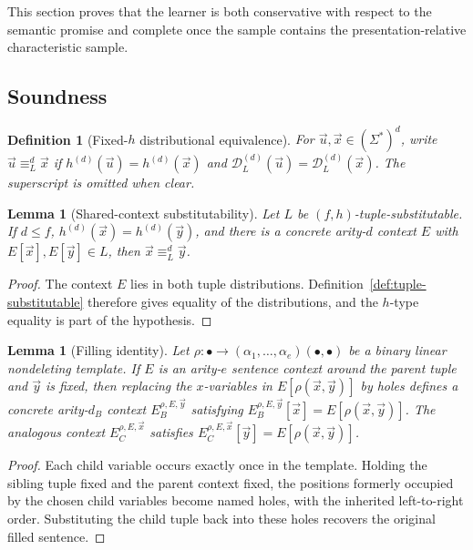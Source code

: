 \documentclass[11pt,a4paper]{article}
\newtheorem{lemma}[theorem]{Lemma}
\newtheorem{definition}[theorem]{Definition}
\theoremstyle{remark}
\newcommand{\D}{\mathcal{D}}
\newcommand{\tuple}[1]{\vec{#1}}
\begin{document}
This section proves that the learner is both conservative with respect to the
semantic promise and complete once the sample contains the presentation-relative
characteristic sample.

\subsection{Soundness}
\label{sec:soundness}

\begin{definition}[Fixed-\(h\) distributional equivalence]
\label{def:distributional-equivalence}
For \(\tuple u,\tuple x\in(\Sigma^*)^d\), write
\(\tuple u\equiv_L^d\tuple x\) if
\(h^{(d)}(\tuple u)=h^{(d)}(\tuple x)\) and
\(\D_L^{(d)}(\tuple u)=\D_L^{(d)}(\tuple x)\).  The superscript is omitted when
clear.
\end{definition}

\begin{lemma}[Shared-context substitutability]
\label{lem:shared-context}
Let \(L\) be \((f,h)\)-tuple-substitutable.  If \(d\le f\),
\(h^{(d)}(\tuple x)=h^{(d)}(\tuple y)\), and there is a concrete arity-\(d\)
context \(E\) with \(E[\tuple x],E[\tuple y]\in L\), then
\(\tuple x\equiv_L^d\tuple y\).
\end{lemma}

\begin{proof}
The context \(E\) lies in both tuple distributions.  Definition~\ref{def:tuple-substitutable}
therefore gives equality of the distributions, and the \(h\)-type equality is
part of the hypothesis.
\end{proof}

\begin{lemma}[Filling identity]
\label{lem:filling-identity}
Let \(\rho\colon\bullet\to(\alpha_1,\ldots,\alpha_e)(\bullet,\bullet)\) be a
binary linear nondeleting template.  If \(E\) is an arity-\(e\) sentence context
around the parent tuple and \(\tuple y\) is fixed, then replacing the
\(x\)-variables in \(E[\rho(\tuple x,\tuple y)]\) by holes defines a concrete
arity-\(d_B\) context \(E_B^{\rho,E,\tuple y}\) satisfying
\(E_B^{\rho,E,\tuple y}[\tuple x]=E[\rho(\tuple x,\tuple y)]\).  The analogous
context \(E_C^{\rho,E,\tuple x}\) satisfies
\(E_C^{\rho,E,\tuple x}[\tuple y]=E[\rho(\tuple x,\tuple y)]\).
\end{lemma}

\begin{proof}
Each child variable occurs exactly once in the template.  Holding the sibling
tuple fixed and the parent context fixed, the positions formerly occupied by
the chosen child variables become named holes, with the inherited left-to-right
order.  Substituting the child tuple back into these holes recovers the original
filled sentence.
\end{proof}
\end{document}
